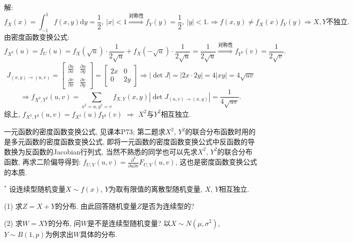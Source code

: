 \documentclass[standard]{ExBook}
\renewenvironment{shaded}{%
  \def\FrameCommand{\fboxsep=\FrameSep \colorbox{shadecolor}}%
  \MakeFramed{\advance\hsize-\width \FrameRestore}%
}{%
  \endMakeFramed
}
\begin{document}
\begin{qitems}
\vspace{\dimexpr2.5cm-5em\relax}

解: 
$$f_{X}(x)=\int_{-1}^{1}f(x,y)\mathrm{d}y=\frac{1}{2},\ |x|<1 \overset{\text{对称性}}{\Longrightarrow} f_{Y}(y)=\frac{1}{2},\ |y|<1. \Longrightarrow f(x,y)\neq f_{X}(x)f_{Y}(y) \Longrightarrow X,Y\text{不独立}.$$
由密度函数变换公式:
$$f_{X^2}(u)=f_{U}(u)=f_{X}(\sqrt{u})\cdot\frac{1}{2\sqrt{u}}+f_{X}(-\sqrt{u})\cdot\frac{1}{2\sqrt{u}}=\frac{1}{2\sqrt{u}} \overset{\text{对称性}}{\Longrightarrow} f_{Y^2}(v)=\frac{1}{2\sqrt{v}}.$$
\[
J_{(x,y)\to(u,v)} = 
\begin{bmatrix}
\frac{\partial u}{\partial x} & \frac{\partial u}{\partial y} \\
\frac{\partial v}{\partial x} & \frac{\partial v}{\partial y}
\end{bmatrix}
=
\begin{bmatrix}
2x & 0 \\
0 & 2y
\end{bmatrix}
\Longrightarrow |\det J| = |2x \cdot 2y| = 4|xy| = 4\sqrt{uv}
\]
\[
\Longrightarrow
f_{X^2,Y^2}(u,v)=\sum\limits_{x^2=u,y^2=v}f_{X,Y}(x,y)|\det J_{(u,v)\to(x,y)}|=\frac{1}{4\sqrt{uv}}.
\]
综上, $f_{X^2,Y^2}(u,v)=f_{X^2}(u)f_{Y^2}(v)$ $\Longrightarrow$ $X^2$与$Y^2$相互独立.

\textcolor{themeColor}{\selectfont {} 一元函数的密度函数变换公式, 见课本P73; 第二题求$X^2$, $Y^2$的联合分布函数时用的是多元函数的密度函数变换公式, 即将一元函数的密度函数变换公式中反函数的导数换为反函数的Jacobian行列式, 当然不熟悉的同学也可以先求$X^2$, $Y^2$的联合分布函数, 再求二阶偏导得到: $f_{U,V}(u,v)=\frac{\partial^2}{\partial u\partial v}F_{U,V}(u,v)$, 这也是密度函数变换公式的本质.}

\vspace{2.5cm-5em}

    \begin{bbox}
    \begin{shaded}
        \qitem$^*$
设连续型随机变量$X\sim f(x)$, $Y$为取有限值的离散型随机变量, $X$, $Y$相互独立.

(1) 求$Z=X+Y$的分布. 由此回答随机变量$Z$是否为连续型的?

(2) 求$W=XY$的分布, 问$W$是不是连续型随机变量? 以$X\sim N(\mu,\sigma^2)$, $Y\sim B(1,p)$为例求出$W$具体的分布.
    \end{shaded}
    \end{bbox}

\vspace{\dimexpr2.5cm-5em\relax}


\end{qitems}
\end{document}
